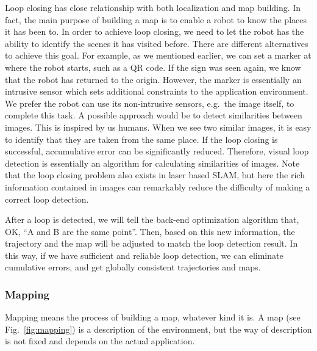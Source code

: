 Loop closing has close relationship with both localization and map building. In fact, the main purpose of building a map is to enable a robot to know the places it has been to. In order to achieve loop closing, we need to let the robot has the ability to identify the scenes it has visited before. There are different alternatives to achieve this goal. For example, as we mentioned earlier, we can set a marker at where the robot starts, such as a QR code. If the sign was seen again, we know that the robot has returned to the origin. However, the marker is essentially an intrusive sensor which sets additional constraints to the application environment. We prefer the robot can use its non-intrusive sensors, e.g.\ the image itself, to complete this task. A possible approach would be to detect similarities between images. This is inspired by us humans. When we see two similar images, it is easy to identify that they are taken from the same place. If the loop closing is successful, accumulative error can be significantly reduced. Therefore, visual loop detection is essentially an algorithm for calculating similarities of images. Note that the loop closing problem also exists in laser based SLAM, but here the rich information contained in images can remarkably reduce the difficulty of making a correct loop detection.

After a loop is detected, we will tell the back-end optimization algorithm that, OK,  ``A and B are the same point''. Then, based on this new information, the trajectory and the map will be adjusted to match the loop detection result. In this way, if we have sufficient and reliable loop detection, we can eliminate cumulative errors, and get globally consistent trajectories and maps.

\subsubsection{Mapping}
Mapping means the process of building a map, whatever kind it is. A map (see Fig.~\ref{fig:mapping}) is a description of the environment, but the way of description is not fixed and depends on the actual application.

